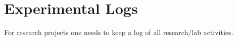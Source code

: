
\chapter{Experimental Logs}

For research projects one needs to keep a log of all research/lab activities.   





